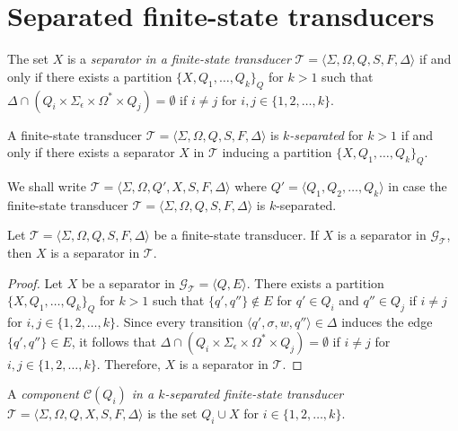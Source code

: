 \section{Separated finite-state transducers}

\begin{definition}
  The set $X$ is a \emph{separator in a finite-state transducer} $\mathcal{T} =
  \langle \Sigma, \Omega, Q, S, F, \Delta \rangle$ if and only if there exists a
  partition $\{ X, Q_1, \ldots, Q_k \}_Q$ for $k > 1$ such that $\Delta \cap (Q_i
  \times \Sigma_\epsilon \times \Omega^* \times Q_j) = \emptyset$ if $i \neq j$ for
  $i, j \in \{ 1, 2, \ldots, k \}$.
\end{definition}

\begin{definition}
  A finite-state transducer $\mathcal{T} = \langle \Sigma, \Omega, Q, S, F, \Delta
  \rangle$ is \emph{$k$-separated} for $k > 1$ if and only if there exists a
  separator $X$ in $\mathcal{T}$ inducing a partition $\{ X, Q_1, \ldots, Q_k
  \}_Q$.
\end{definition}

We shall write $\mathcal{T} = \langle \Sigma, \Omega, Q', X, S, F, \Delta \rangle$
where $Q' = \langle Q_1, Q_2, \ldots, Q_k \rangle$ in case the finite-state
transducer $\mathcal{T} = \langle \Sigma, \Omega, Q, S, F, \Delta \rangle$ is
$k$-separated.

\begin{proposition}
  Let $\mathcal{T} = \langle \Sigma, \Omega, Q, S, F, \Delta \rangle$ be a
  finite-state transducer. If $X$ is a separator in $\mathcal{G}_\mathcal{T}$,
  then $X$ is a separator in $\mathcal{T}$.
\end{proposition}

\begin{proof}
  Let $X$ be a separator in $\mathcal{G}_\mathcal{T} = \langle Q, E \rangle$. There
  exists a partition $\{ X, Q_1, \ldots, Q_k \}_Q$ for $k > 1$ such that $\{
  q', q'' \} \not\in E$ for $q' \in Q_i$ and $q'' \in Q_j$ if $i \neq j$ for $i, j
  \in \{ 1, 2, \ldots, k \}$. Since every transition $\langle q', \sigma, w, q''
  \rangle \in \Delta$ induces the edge $\{ q', q'' \} \in E$, it follows that $\Delta \cap (Q_i \times
  \Sigma_\epsilon \times \Omega^* \times Q_j) = \emptyset$ if $i \neq j$ for $i, j
  \in \{ 1, 2, \ldots, k \}$. Therefore, $X$ is a separator in $\mathcal{T}$.
\end{proof}

\begin{definition}
  A \emph{component $\mathcal{C}(Q_i)$ in a $k$-separated finite-state transducer}
  $\mathcal{T} = \langle \Sigma, \Omega, Q, X, S, F, \Delta \rangle$ is the set $Q_i
  \cup X$ for $i \in \{ 1, 2, \ldots, k \}$.
\end{definition}

